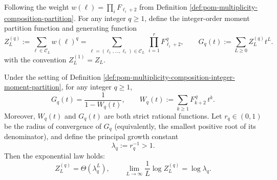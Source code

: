 \begin{definition}\label{def:pom-multiplicity-composition-integer-moment-partition}
Following the weight \(w(\boldsymbol{\ell})=\prod_i F_{\ell_i+2}\) from Definition \ref{def:pom-multiplicity-composition-partition}.
For any integer \(q\ge 1\), define the integer-order moment partition function and generating function
\[
Z_L^{(q)}
:=\sum_{\boldsymbol{\ell}\in\mathcal{C}_L} w(\boldsymbol{\ell})^{q}
=\sum_{\boldsymbol{\ell}=(\ell_1,\dots,\ell_r)\in\mathcal{C}_L}\ \prod_{i=1}^{r}F_{\ell_i+2}^{\,q},
\qquad
G_q(t):=\sum_{L\ge 0} Z_L^{(q)}t^L.
\]
with the convention \(Z_L^{(1)}=Z_L\).
\end{definition}

\begin{proposition}\label{prop:pom-multiplicity-composition-moment-hierarchy-rational-growth}
Under the setting of Definition \ref{def:pom-multiplicity-composition-integer-moment-partition}, for any integer \(q\ge 1\),
\begin{equation}\label{eq:pom-multiplicity-composition-moment-hierarchy-gf}
\boxed{\;
G_q(t)=\frac{1}{1-W_q(t)},
\qquad
W_q(t):=\sum_{k\ge 1}F_{k+2}^{\,q}\,t^k.\;}
\end{equation}
Moreover, \(W_q(t)\) and \(G_q(t)\) are both strict rational functions.
Let \(r_q\in(0,1)\) be the radius of convergence of \(G_q\) (equivalently, the smallest positive root of its denominator), and define the principal growth constant
\[
\boxed{\;\lambda_q:=r_q^{-1}>1.\;}
\]
Then the exponential law holds:
\[
\boxed{\;Z_L^{(q)}=\Theta(\lambda_q^{L}),\qquad
\lim_{L\to\infty}\frac1L\log Z_L^{(q)}=\log\lambda_q.\;}
\]
\end{proposition}
